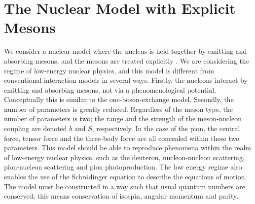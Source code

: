 \chapter{The Nuclear Model with Explicit Mesons}\label{Decsofmodel}
We consider a nuclear model where the nucleus is held together by emitting and absorbing mesons, and the mesons are treated explicitly \cite[]{Fedorov2020}. We are considering the regime of low-energy nuclear physics, and this model is different from conventional interaction models in several ways. Firstly, the nucleons interact by emitting and absorbing mesons, not via a phenomenological potential. Conceptually this is similar to the one-boson-exchange model. Secondly, the number of parameters is greatly reduced. Regardless of the meson type, the number of parameters is two; the range and the strength of the meson-nucleon coupling are denoted $b$ and $S$, respectively. In the case of the pion, the central force, tensor force and the three-body force are all concealed within these two parameters. This model should be able to reproduce phenomena within the realm of low-energy nuclear physics, such as the deuteron, nucleon-nucleon scattering, pion-nucleon scattering and pion photoproduction. The low energy regime also enables the use of the Schrödinger equation to describe the equations of motion. The model must be constructed in a way such that usual quantum numbers are conserved; this means conservation of isospin, angular momentum and parity. 

